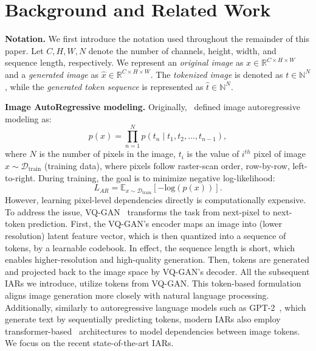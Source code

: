 
\section{Background and Related Work}
\label{sec:background}


\textbf{Notation.} We first introduce the notation used throughout the remainder of this paper. Let \( C, H, W, N \) denote the number of channels, height, width, and sequence length, respectively. We represent an \textit{original image} as \( x \in \mathbb{R}^{C \times H \times W} \) and a \textit{generated image} as \( \hat{x} \in \mathbb{R}^{C \times H \times W} \). The \textit{tokenized image} is denoted as \( t \in \mathbb{N}^N \), while the \textit{generated token sequence} is represented as \( \hat{t} \in \mathbb{N}^N \).


\textbf{Image AutoRegressive modeling.}
Originally,~\citet{chen2020generative} defined image autoregressive modeling as: 
\begin{equation}
p(x) = \prod_{n=1}^N p(t_n \mid t_1, t_2, \ldots, t_{n-1}),
\label{eq:ar_task}
\end{equation}
where $N$ is the number of pixels in the image, $t_i$ is the value of $i^{th}$ pixel of image $x\sim\mathcal{D}_{\text{train}}$ (training data), where pixels follow raster-scan order, row-by-row, left-to-right. 
During training, the goal is to minimize negative log-likelihood:
\begin{equation}
L_{AR} = \mathbb{E}_{x\sim\mathcal{D}_{\text{train}}}\left[-\text{log}\left(p\left(x\right)\right)\right].
\label{eq:ar_loss}
\end{equation}
However, learning pixel-level dependencies directly is computationally expensive. 
To address the issue, VQ-GAN~\citep{esser2020taming} transforms the task from next-pixel to next-token prediction. First, the VQ-GAN's encoder maps an image into (lower resolution) latent feature vector, which is then quantized into a sequence of tokens, by a learnable codebook. In effect, the sequence length is short, which enables higher-resolution and high-quality generation. Then, tokens are generated and projected back to the image space by VQ-GAN's decoder. All the subsequent IARs we introduce, utilize tokens from VQ-GAN.
This token-based formulation aligns image generation more closely with natural language processing. Additionally, similarly to autoregressive language models such as GPT-2~\citep{radford2019language}, which generate text by sequentially predicting tokens, modern IARs also employ transformer-based~\citep{vaswani2017attention} architectures to model dependencies between image tokens.
We focus on the recent state-of-the-art IARs. 





